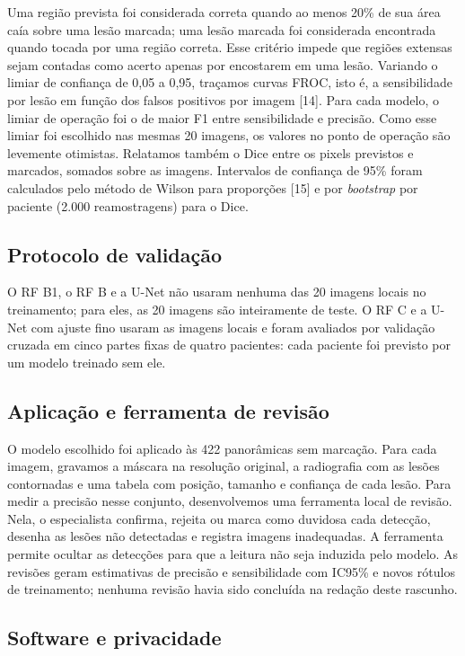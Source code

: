 \documentclass[twocolumn]{article}
\begin{document}
Uma região prevista foi considerada correta quando ao menos 20\% de sua área caía sobre uma lesão marcada; uma lesão marcada foi considerada encontrada quando tocada por uma região correta. Esse critério impede que regiões extensas sejam contadas como acerto apenas por encostarem em uma lesão. Variando o limiar de confiança de 0,05 a 0,95, traçamos curvas FROC, isto é, a sensibilidade por lesão em função dos falsos positivos por imagem [14]. Para cada modelo, o limiar de operação foi o de maior F1 entre sensibilidade e precisão. Como esse limiar foi escolhido nas mesmas 20 imagens, os valores no ponto de operação são levemente otimistas. Relatamos também o Dice entre os pixels previstos e marcados, somados sobre as imagens. Intervalos de confiança de 95\% foram calculados pelo método de Wilson para proporções [15] e por \textit{bootstrap} por paciente (2.000 reamostragens) para o Dice.

\subsection{Protocolo de validação}

O RF B1, o RF B e a U-Net não usaram nenhuma das 20 imagens locais no treinamento; para eles, as 20 imagens são inteiramente de teste. O RF C e a U-Net com ajuste fino usaram as imagens locais e foram avaliados por validação cruzada em cinco partes fixas de quatro pacientes: cada paciente foi previsto por um modelo treinado sem ele.

\subsection{Aplicação e ferramenta de revisão}

O modelo escolhido foi aplicado às 422 panorâmicas sem marcação. Para cada imagem, gravamos a máscara na resolução original, a radiografia com as lesões contornadas e uma tabela com posição, tamanho e confiança de cada lesão. Para medir a precisão nesse conjunto, desenvolvemos uma ferramenta local de revisão. Nela, o especialista confirma, rejeita ou marca como duvidosa cada detecção, desenha as lesões não detectadas e registra imagens inadequadas. A ferramenta permite ocultar as detecções para que a leitura não seja induzida pelo modelo. As revisões geram estimativas de precisão e sensibilidade com IC95\% e novos rótulos de treinamento; nenhuma revisão havia sido concluída na redação deste rascunho.

\subsection{Software e privacidade}
\end{document}
